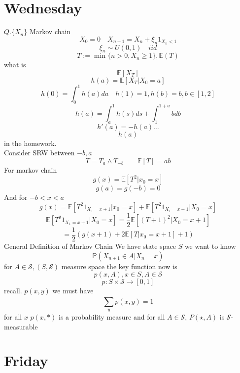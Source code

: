 \documentclass[11pt]{article}
\begin{document}
\section{Wednesday}
$Q. \{X_n\}$ Markov chain
 \[
X_0 = 0 \quad     X_{n+1} = X_n + \xi_n 1_{X_n < 1}
\] 
\[
\xi_n \sim U(0,1) \quad iid
\] 
\[
    T := \min\{n > 0 , X_n \ge 1\}, \mathbb{E}(T)
\] 
what is
\[
    \mathbb{E}[X_T]
\] 
\[
h(a) = \mathbb{E}[X_T | X_0 = a]
\] 
\[
    h(0) = \int_{0}^{1}h(a)da \quad h(1) = 1, h(b) = b, b \in [1,2]
\] 
\[
h(a) = \int_{a}^{1}h(s)ds + \int_{1}^{1+a}bdb
\] 
\[
h'(a) = -h(a) \dots
\] 
\[
h(a)
\] 
in the homework.\\
Consider SRW between $-b, a$
 \[
     T = T_a \wedge T_{-b} \qquad \mathbb{E}[T] = ab
\] 
For markov chain
\[
    g(x) = \mathbb{E}[T^2 | x_0 = x]
\] 
\[
g(a) = g(-b) = 0
\] 
And for $ - b < x < a$
\[
    g(x) = \mathbb{E}[T^2 1_{X_1 = x + 1} | x_0 = x] + \mathbb{E}[T^2 1_{X_1 = x -1} | X_0 = x]
\] 
\[
    \mathbb{E}[T^2 1_{X_1 = x + 1} | X_0 = x] = \frac{1}{2} \mathbb{E}[(T+1)^2 | X_0 = x + 1] 
\] 
\[
    = \frac{1}{2} (g(x+1) + 2 \mathbb{E}[T | x_0 = x + 1] +  1)
\] 
General Definition of Markov Chain
We have state space $S$ we want to know
\[
    \mathbb{P}(X_{n+1} \in A | X_n = x)
\] 
for $A \in \mathcal{S}, (S, \mathcal{S})$ measure space the key function now is
 \[
     p(x,A), x \in S, A \in \mathcal{S}
\] 
\[
    p : S \times \mathcal{S} \to [0,1]
\] 
recall. $p(x,y)$ we must have 
 \[
\sum_{y}^{}p(x,y) = 1
\] 
for all $x$  $p(x, *)$ is a probability measure and
for all  $A \in \mathcal{S}$,  $P(\star, A)$ is  $\mathcal{S}$-measurable

\section{Friday}
\end{document}
